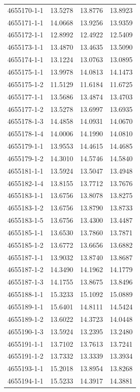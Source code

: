 \begin{longtable}{lrrr}
4655170-1-1 & 13.5278 & 13.8776 & 13.8923 \\
4655171-1-1 & 14.0668 & 13.9256 & 13.9359 \\
4655172-1-1 & 12.8992 & 12.4922 & 12.5409 \\
4655173-1-1 & 13.4870 & 13.4635 & 13.5090 \\
4655174-1-1 & 13.1224 & 13.0763 & 13.0895 \\
4655175-1-1 & 13.9978 & 14.0813 & 14.1473 \\
4655175-1-2 & 11.5129 & 11.6184 & 11.6725 \\
4655177-1-1 & 13.5686 & 13.4874 & 13.4703 \\
4655177-1-2 & 13.5278 & 13.6997 & 13.6935 \\
4655178-1-3 & 14.4858 & 14.0931 & 14.0670 \\
4655178-1-4 & 14.0006 & 14.1990 & 14.0810 \\
4655179-1-1 & 13.9553 & 14.4615 & 14.4685 \\
4655179-1-2 & 14.3010 & 14.5746 & 14.5840 \\
4655181-1-1 & 13.5924 & 13.5047 & 13.4948 \\
4655182-1-4 & 13.8155 & 13.7712 & 13.7676 \\
4655183-1-1 & 13.6756 & 13.8078 & 13.8275 \\
4655183-1-2 & 13.6756 & 13.8790 & 13.8733 \\
4655183-1-5 & 13.6756 & 13.4300 & 13.4487 \\
4655185-1-1 & 13.6530 & 13.7860 & 13.7871 \\
4655185-1-2 & 13.6772 & 13.6656 & 13.6882 \\
4655187-1-1 & 13.9032 & 13.8740 & 13.8687 \\
4655187-1-2 & 14.3490 & 14.1962 & 14.1779 \\
4655187-1-3 & 14.1755 & 13.8675 & 13.8496 \\
4655188-1-1 & 15.3233 & 15.1092 & 15.0889 \\
4655189-1-1 & 15.6401 & 14.8111 & 14.5424 \\
4655189-1-2 & 13.6022 & 14.3723 & 14.0448 \\
4655190-1-3 & 13.5924 & 13.2395 & 13.2480 \\
4655191-1-1 & 13.7102 & 13.7613 & 13.7241 \\
4655191-1-2 & 13.7332 & 13.3339 & 13.3934 \\
4655193-1-1 & 15.2018 & 13.8954 & 13.8268 \\
4655194-1-1 & 15.5233 & 14.3917 & 14.3881 \\

\end{longtable}
